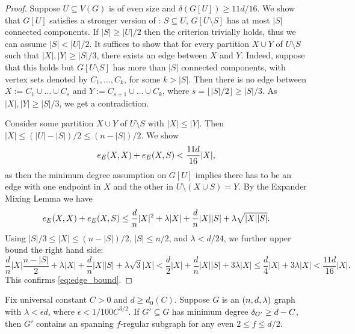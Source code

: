 \documentclass[11pt]{article}
\begin{document}
\begin{proof}
  Suppose $U \subseteq V(G)$ is of even size and $\delta(G[U]) \ge 11d/16$.
  We show that $G[U]$ satisfies a stronger version of :  $S \subseteq U$, $G[U \setminus S]$ has at most $|S|$ connected components.
  If $|S| \ge |U|/2$ then the criterion trivially holds, thus we can assume $|S| < |U|/2$.
  It suffices to show that for every partition $X \cup Y$ of $U \setminus S$ such that $|X|, |Y| \ge |S|/3$, there exists an edge between $X$ and $Y$.
  Indeed, suppose that this holds but $G[U \setminus S]$ has more than $|S|$ connected components, with vertex sets denoted by $C_1, \ldots, C_k$, for some $k > |S|$.
  Then there is no edge between $X := C_1 \cup \ldots \cup C_{s}$ and $Y := C_{s+1} \cup \ldots \cup C_{k}$, where $s = \lfloor |S|/2 \rfloor \ge |S|/3$. As $|X|, |Y| \ge |S|/3$, we get a contradiction.

    Consider some partition $X \cup Y$ of $U \setminus S$ with $|X| \le |Y|$. Then $|X| \le (|U| - |S|)/2 \le (n - |S|)/2$. We show
    \begin{equation} \label{eq:edge_bound}
        \CutEdges{X}{X}{E} + \CutEdges{X}{S}{E} < \frac{11d}{16}|X|,
    \end{equation}
    as then the minimum degree assumption on $G[U]$ implies there has to be an edge with one endpoint in $X$ and the other in $U \setminus (X \cup S) = Y$. By the Expander Mixing Lemma we have
    \[
        \CutEdges{X}{X}{E} + \CutEdges{X}{S}{E} \le \frac{d}{n}|X|^2 + \lambda |X| + \frac{d}{n}|X||S| + \lambda\sqrt{|X||S|}.
    \]
    Using $|S|/3 \le |X| \le (n-|S|)/2$, $|S| \le n/2$, and $\lambda < d/24$,  we further upper bound the right hand side:
    \[
        \frac{d}{n} |X| \frac{n-|S|}{2} + \lambda |X| + \frac{d}{n}|X||S| + \lambda\sqrt{3} |X| < \frac{d}{2}|X| + \frac{d}{n}|X||S| + 3 \lambda |X| \le \frac{d}{4} |X| + 3\lambda |X| < \frac{11d}{16}|X|.
    \]
    This confirms \eqref{eq:edge_bound}.
\end{proof}

\begin{lemma}\label{lemma:f-factor}
  Fix universal constant $C > 0$ and $d \ge d_0(C)$.
Suppose $G$ is an $\EnDeeLambda$ graph with $\lambda < \epsilon d$, where $\epsilon < 1/100C^{3/2}$.
If $G' \subseteq G$ has minimum degree $\MinimalDegree{G'} \ge d - C$, then $G'$ contains an spanning $f$-regular subgraph for any even $2 \le f \le d/2$.
\end{lemma}
\end{document}
